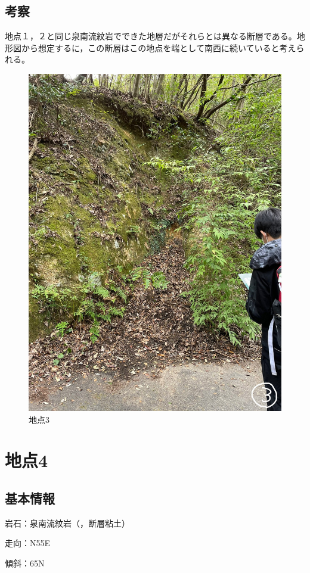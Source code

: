 \documentclass[uplatex,b5paper]{jsreport}
\begin{document}
    \subsection{考察}
    地点１，２と同じ泉南流紋岩でできた地層だがそれらとは異なる断層である。地形図から想定するに，この断層はこの地点を端として南西に続いていると考えられる。
  \begin{figure}[h]
    \begin{center}
      \includegraphics[scale=0.07]{files/地学実習/地点3.jpg}
      \caption{地点3}
    \end{center}
  \end{figure}
  \clearpage

  \section{地点4}
    \subsection{基本情報}
    岩石：泉南流紋岩（，断層粘土）\par
    走向：N55\textdegree E\par
    傾斜：65\textdegree N\par
\end{document}
